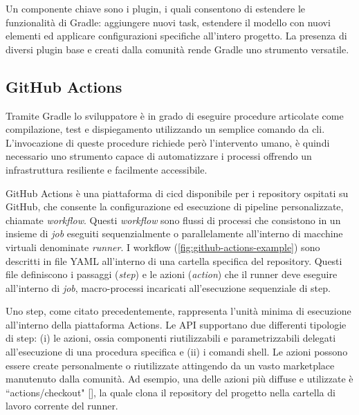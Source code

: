 Un componente chiave sono i plugin, i quali consentono di estendere le funzionalità di Gradle: aggiungere nuovi task, estendere il modello con nuovi elementi ed applicare configurazioni specifiche all'intero progetto. La presenza di diversi plugin base e creati dalla comunità rende Gradle uno strumento versatile.

\subsection{GitHub Actions}

Tramite Gradle lo sviluppatore è in grado di eseguire procedure articolate come compilazione, test e dispiegamento utilizzando un semplice comando da \ac{cli}. L'invocazione di queste procedure richiede però l'intervento umano, è quindi necessario uno strumento capace di automatizzare i processi offrendo un infrastruttura resiliente e facilmente accessibile.

GitHub Actions è una piattaforma di \ac{cicd} disponibile per i repository ospitati su GitHub, che consente la configurazione ed esecuzione di pipeline personalizzate, chiamate \textit{workflow}. Questi \textit{workflow} sono flussi di processi che consistono in un insieme di \textit{job} eseguiti sequenzialmente o parallelamente all'interno di macchine virtuali denominate \textit{runner}. I workflow (\cref{fig:github-actions-example}) sono descritti in file YAML all'interno di una cartella specifica del repository. Questi file definiscono i passaggi (\textit{step}) e le azioni (\textit{action}) che il runner deve eseguire all'interno di \textit{job}, macro-processi incaricati all'esecuzione sequenziale di step.


Uno step, come citato precedentemente, rappresenta l'unità minima di esecuzione all'interno della piattaforma Actions. Le API supportano due differenti tipologie di step: (i) le azioni, ossia componenti riutilizzabili e parametrizzabili delegati all'esecuzione di una procedura specifica e (ii) i comandi shell. Le azioni possono essere create personalmente o riutilizzate attingendo da un vasto marketplace manutenuto dalla comunità.  Ad esempio, una delle azioni più diffuse e utilizzate è ``actions/checkout" [\cite{github-actions-diffusion}], la quale clona il repository del progetto nella cartella di lavoro corrente del runner.

